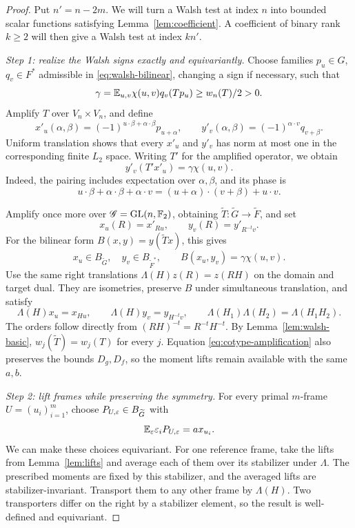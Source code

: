 \begin{proof}
Put \(n'=n-2m\). We will turn a Walsh test at index \(n\) into
bounded scalar functions satisfying Lemma~\ref{lem:coefficient}. A
coefficient of binary rank \(k\ge2\) will then give a Walsh test
at index \(kn'\).

\medskip
\textit{Step 1: realize the Walsh signs exactly and equivariantly.}
Choose families \(p_u\in G\), \(q_v\in F^*\) admissible in
\eqref{eq:walsh-bilinear}, changing a sign if necessary, such that
\[
\gamma=\mathbb E_{u,v}\chi(u,v)q_v(Tp_u)\ge w_n(T)/2>0.
\]
Amplify \(T\) over \(V_n\times V_n\), and define
\[
x'_u(\alpha,\beta)=(-1)^{u\cdot\beta+\alpha\cdot\beta}p_{u+\alpha},
\qquad
y'_v(\alpha,\beta)=(-1)^{\alpha\cdot v}q_{v+\beta}.
\]
Uniform translation shows that every \(x'_u\) and \(y'_v\) has
norm at most one in the corresponding finite \(L_2\) space.
Writing \(T'\) for the amplified operator, we obtain
\[
y'_v(T'x'_u)=\gamma\chi(u,v).
\]
Indeed, the pairing includes expectation over \(\alpha,\beta\),
and its phase is
\[
u\cdot\beta+\alpha\cdot\beta+\alpha\cdot v
=(u+\alpha)\cdot(v+\beta)+u\cdot v.
\]

Amplify once more over \(\mathscr G=\mathrm{GL}(n,\mathbb F_2)\), obtaining
\(\widetilde T:\widetilde G\to\widetilde F\), and set
\[
x_u(R)=x'_{Ru},\qquad y_v(R)=y'_{R^{-t}v}.
\]
For the bilinear form \(B(x,y)=y(\widetilde T x)\), this gives
\begin{equation}\label{eq:exact-pairing}
x_u\in B_{\widetilde G},\quad y_v\in B_{\widetilde F^*},
\qquad B(x_u,y_v)=\gamma\chi(u,v).
\end{equation}
Use the same right translations
\(\Lambda(H)z(R)=z(RH)\) on the domain and target dual.
They are isometries, preserve \(B\) under simultaneous translation,
and satisfy
\[
\Lambda(H)x_u=x_{Hu},\qquad
\Lambda(H)y_v=y_{H^{-t}v},\qquad
\Lambda(H_1)\Lambda(H_2)=\Lambda(H_1H_2).
\]
The orders follow directly from \((RH)^{-t}=R^{-t}H^{-t}\).
By Lemma~\ref{lem:walsh-basic},
\(w_j(\widetilde T)=w_j(T)\) for every \(j\).
Equation \eqref{eq:cotype-amplification} also preserves the bounds
\(D_g,D_f\), so the moment lifts remain available with the same
\(a,b\).

\medskip
\textit{Step 2: lift frames while preserving the symmetry.}
For every primal \(m\)-frame \(U=(u_i)_{i=1}^m\), choose
\(P_{U,\varepsilon}\in B_{\widetilde G}\) with
\[
\mathbb E_\varepsilon\varepsilon_iP_{U,\varepsilon}=ax_{u_i}.
\]
We can make these choices equivariant. For one reference frame,
take the lifts from Lemma~\ref{lem:lifts} and average each of them over
its stabilizer under \(\Lambda\). The prescribed moments are fixed
by this stabilizer, and the averaged lifts are stabilizer-invariant.
Transport them to any other frame by \(\Lambda(H)\).
Two transporters differ on the right by a stabilizer element, so
the result is well-defined and equivariant.


\end{proof}
